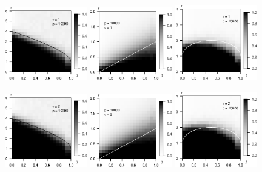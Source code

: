 \begin{figure}
	\centering
	\includegraphics[width=0.32\textwidth]{figures/sim_strong_boundary/simulated_strong_boundary_chi-squared_nu1_p10000.eps}
    \includegraphics[width=0.32\textwidth]{figures/sim_weak_boundary/simulated_weak_boundary_chi-squared_nu1_p10000.eps}
    \includegraphics[width=0.32\textwidth]{figures/sim_approx-exact_boundary/simulated_approx-exact_boundary_chi-squared_nu1_p10000.eps}
    
	\includegraphics[width=0.32\textwidth]{figures/sim_strong_boundary/simulated_strong_boundary_chi-squared_nu2_p10000.eps}
    \includegraphics[width=0.32\textwidth]{figures/sim_weak_boundary/simulated_weak_boundary_chi-squared_nu2_p10000.eps}
    \includegraphics[width=0.32\textwidth]{figures/sim_approx-exact_boundary/simulated_approx-exact_boundary_chi-squared_nu2_p10000.eps}
	

\end{figure}
